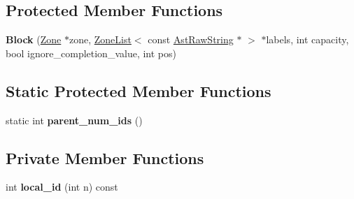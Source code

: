 \subsection*{Protected Member Functions}
\begin{DoxyCompactItemize}
\item 
{\bfseries Block} (\hyperlink{classv8_1_1internal_1_1_zone}{Zone} $\ast$zone, \hyperlink{classv8_1_1internal_1_1_zone_list}{Zone\+List}$<$ const \hyperlink{classv8_1_1internal_1_1_ast_raw_string}{Ast\+Raw\+String} $\ast$ $>$ $\ast$labels, int capacity, bool ignore\+\_\+completion\+\_\+value, int pos)\hypertarget{classv8_1_1internal_1_1_block_a2ef2ea89fb48a71195598011fc565d66}{}\label{classv8_1_1internal_1_1_block_a2ef2ea89fb48a71195598011fc565d66}

\end{DoxyCompactItemize}
\subsection*{Static Protected Member Functions}
\begin{DoxyCompactItemize}
\item 
static int {\bfseries parent\+\_\+num\+\_\+ids} ()\hypertarget{classv8_1_1internal_1_1_block_a7408d1394391e4ce9030bbc3e895761b}{}\label{classv8_1_1internal_1_1_block_a7408d1394391e4ce9030bbc3e895761b}

\end{DoxyCompactItemize}
\subsection*{Private Member Functions}
\begin{DoxyCompactItemize}
\item 
int {\bfseries local\+\_\+id} (int n) const \hypertarget{classv8_1_1internal_1_1_block_ad6f2fa09a69a2f3fc1cac97f6c4950be}{}\label{classv8_1_1internal_1_1_block_ad6f2fa09a69a2f3fc1cac97f6c4950be}

\end{DoxyCompactItemize}
